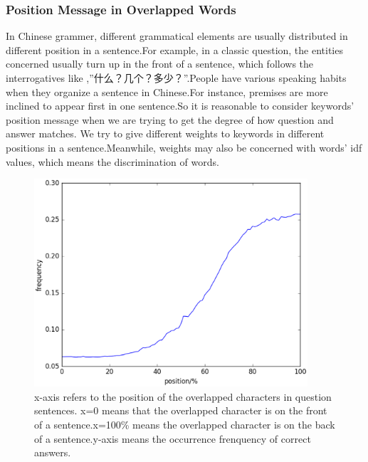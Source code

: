 \documentclass{llncs}
\begin{document}
\subsubsection{Position Message in Overlapped Words}
In Chinese grammer, different grammatical elements are usually distributed in different position in a sentence.For example, in a classic question, the entities concerned usually turn up in the front of a sentence, which follows the interrogatives like ,”什么？几个？多少？”.People have various speaking habits when they organize a sentence in Chinese.For instance, premises are more inclined to appear first in one sentence.So it is reasonable to consider keywords’ position message when we are trying to get the degree of how question and answer matches. We try to give different weights to keywords in different positions in a sentence.Meanwhile, weights may also be concerned with words’ idf values, which means the discrimination of words.

\begin{figure}
\centering
\includegraphics[width=4in]{figures/character_position.eps}
\caption{x-axis refers to the position of the overlapped characters in question sentences. x=0 means that the overlapped character is on the front of  a sentence.x=100\% means the overlapped character is on the back of a sentence.y-axis means the occurrence frenquency of correct answers.}
\label{fig:character_position}
\end{figure}
\end{document}
